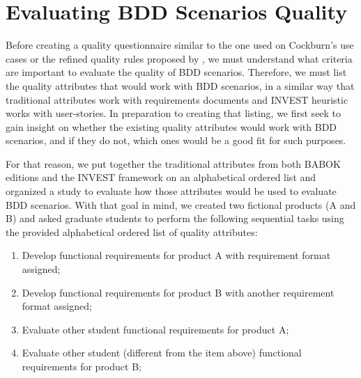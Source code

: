 \section{Evaluating BDD Scenarios Quality}

Before creating a quality questionnaire similar to the one used on Cockburn's use cases \cite{Cockburn_2000} or the refined quality rules proposed by \cite{Phalp_et_dot_al_2011}, we must understand what criteria are important to evaluate the quality of BDD scenarios. Therefore, we must list the quality attributes that would work with BDD scenarios, in a similar way that traditional attributes \cite{Babok_2009} \cite{Babok_2015} work with requirements documents and INVEST heuristic \cite{Cohn_2004} works with user-stories. In preparation to creating that listing, we first seek to gain insight on whether the existing quality attributes would work with BDD scenarios, and if they do not, which ones would be a good fit for such purposes.

For that reason, we put together the traditional attributes from both BABOK editions \cite{Babok_2009} \cite{Babok_2015} and the INVEST framework \cite{Cohn_2004} on an alphabetical ordered list and organized a study to evaluate how those attributes would be used to evaluate BDD scenarios. With that goal in mind, we created two fictional products (A and B) and asked graduate students to perform the following sequential tasks using the provided alphabetical ordered list of quality attributes:

\begin{enumerate}
    \item Develop functional requirements for product A with requirement format assigned;
    \item Develop functional requirements for product B with another requirement format assigned;
    \item Evaluate other student functional requirements for product A;
    \item Evaluate other student (different from the item above) functional requirements for product B;
\end{enumerate}


